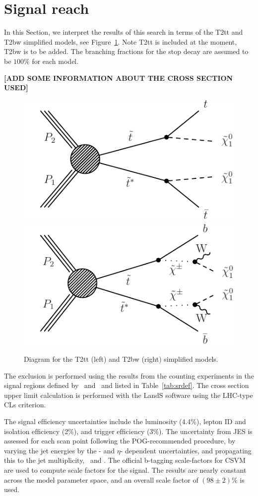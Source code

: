 \section{Signal reach}
\label{sec:signal}

In this Section, we interpret the results of this search in terms of
the T2tt and T2bw simplified models, see Figure~\ref{fig:SigDiagram}.
Note T2tt is included at the moment, T2bw is to be added.
The branching fractions for the stop decay are assumed to be $100\%$
for each model. 

{\bf[ADD SOME INFORMATION ABOUT THE CROSS SECTION USED]}

\begin{figure}[hbt]
  \begin{center}
        \includegraphics[width=0.5\linewidth]{plots/stopPlot/T2tt.pdf}%
        \includegraphics[width=0.5\linewidth]{plots/stopPlot/T2bw.pdf}%
	\caption{Diagram for the T2tt (left) and T2bw (right)
          simplified models.}
	\label{fig:SigDiagram}
      \end{center}
\end{figure}

The exclusion is performed using the results from the counting experiments in the signal regions
defined by \met\ and \mt\ and listed in Table~\ref{tab:srdef}. 
The cross section upper limit calculation is performed with the LandS software using the LHC-type CLs criterion. 

The signal efﬁciency uncertainties include the luminosity (4.4\%), lepton ID and isolation
efﬁciency (2\%), and trigger efﬁciency (3\%). The uncertainty from JES
is assessed for each scan point following the POG-recommended
procedure, by varying the jet energies by the \pt- and $\eta$-
dependent uncertainties, and propagating this to the jet multiplicity,
\met\ and \mt. The official b-tagging scale-factors for CSVM are used to compute scale
factors for the signal. The results are nearly constant across the
model parameter space, and an overall scale factor of $(98 \pm 2)\%$
is used. 

